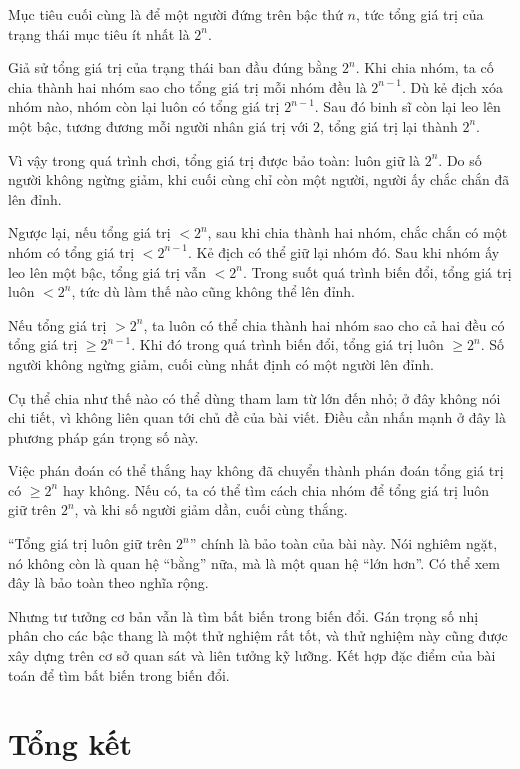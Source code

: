 \documentclass[11pt]{article}
\begin{document}
Mục tiêu cuối cùng là để một người đứng trên bậc thứ \(n\), tức tổng giá trị
của trạng thái mục tiêu ít nhất là \(2^n\).

Giả sử tổng giá trị của trạng thái ban đầu đúng bằng \(2^n\). Khi chia nhóm,
ta cố chia thành hai nhóm sao cho tổng giá trị mỗi nhóm đều là \(2^{n-1}\).
Dù kẻ địch xóa nhóm nào, nhóm còn lại luôn có tổng giá trị \(2^{n-1}\). Sau
đó binh sĩ còn lại leo lên một bậc, tương đương mỗi người nhân giá trị với
\(2\), tổng giá trị lại thành \(2^n\).

Vì vậy trong quá trình chơi, tổng giá trị được bảo toàn: luôn giữ là \(2^n\).
Do số người không ngừng giảm, khi cuối cùng chỉ còn một người, người ấy chắc
chắn đã lên đỉnh.

Ngược lại, nếu tổng giá trị \(<2^n\), sau khi chia thành hai nhóm, chắc chắn
có một nhóm có tổng giá trị \(<2^{n-1}\). Kẻ địch có thể giữ lại nhóm đó. Sau
khi nhóm ấy leo lên một bậc, tổng giá trị vẫn \(<2^n\). Trong suốt quá trình
biến đổi, tổng giá trị luôn \(<2^n\), tức dù làm thế nào cũng không thể lên
đỉnh.

Nếu tổng giá trị \(>2^n\), ta luôn có thể chia thành hai nhóm sao cho cả hai
đều có tổng giá trị \(\ge 2^{n-1}\). Khi đó trong quá trình biến đổi, tổng
giá trị luôn \(\ge 2^n\). Số người không ngừng giảm, cuối cùng nhất định có
một người lên đỉnh.

Cụ thể chia như thế nào có thể dùng tham lam từ lớn đến nhỏ; ở đây không nói
chi tiết, vì không liên quan tới chủ đề của bài viết. Điều cần nhấn mạnh ở
đây là phương pháp gán trọng số này.

Việc phán đoán có thể thắng hay không đã chuyển thành phán đoán tổng giá trị
có \(\ge 2^n\) hay không. Nếu có, ta có thể tìm cách chia nhóm để tổng giá trị
luôn giữ trên \(2^n\), và khi số người giảm dần, cuối cùng thắng.

``Tổng giá trị luôn giữ trên \(2^n\)'' chính là bảo toàn của bài này. Nói
nghiêm ngặt, nó không còn là quan hệ ``bằng'' nữa, mà là một quan hệ ``lớn
hơn''. Có thể xem đây là bảo toàn theo nghĩa rộng.

Nhưng tư tưởng cơ bản vẫn là tìm bất biến trong biến đổi. Gán trọng số nhị
phân cho các bậc thang là một thử nghiệm rất tốt, và thử nghiệm này cũng được
xây dựng trên cơ sở quan sát và liên tưởng kỹ lưỡng. Kết hợp đặc điểm của bài
toán để tìm bất biến trong biến đổi.

\section*{Tổng kết}
\end{document}

